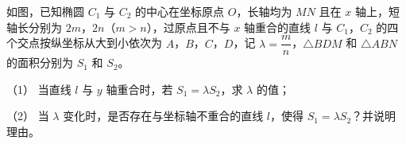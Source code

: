 \begin{question}
如图，已知椭圆 $C_1$ 与 $C_2$ 的中心在坐标原点 $O$，长轴均为 $MN$ 且在 $x$ 轴上，短轴长分别为 $2m$，$2n$（$m>n$），过原点且不与 $x$ 轴重合的直线 $l$ 与 $C_1$，$C_2$ 的四个交点按纵坐标从大到小依次为 $A$，$B$，$C$，$D$，记 $\lambda=\dfrac mn$，$\triangle BDM$ 和 $\triangle ABN$ 的面积分别为 $S_1$ 和 $S_2$。
\nopagebreak[4]
\begin{center}\end{center}
\nopagebreak[4]
（1） 当直线 $l$ 与 $y$ 轴重合时，若 $S_1=\lambda S_2$，求 $\lambda$ 的值；

（2） 当 $\lambda$ 变化时，是否存在与坐标轴不重合的直线 $l$，使得 $S_1=\lambda S_2$？并说明理由。

\end{question}